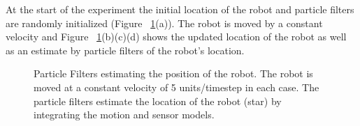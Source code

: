 \documentclass[12pt]{dalcsthesis}
\begin{document}
At the start of the experiment  the initial location of the robot and particle filters are randomly initialized (Figure ~\ref{fig-: movement simulation world}(a)). The robot is moved by a constant velocity and Figure ~\ref{fig-: movement simulation world}(b)(c)(d) shows the updated location of the robot as well as an estimate by particle filters of the robot's location.



\begin{figure}
  \centering
  \qquad
  \qquad
  \qquad
  \caption{\label{fig-: movement simulation world}Particle Filters estimating the position of the robot. The robot is moved at a constant velocity of 5 units/timestep in each case. The particle filters estimate the location of the robot (star) by integrating the motion and sensor models.}
\end{figure}
\end{document}
